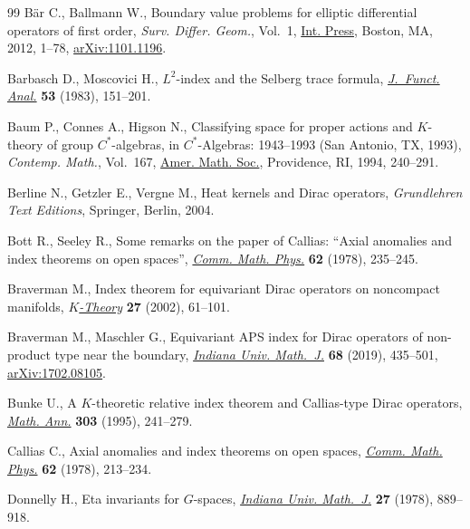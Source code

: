 \begin{thebibliography}{99}
B\"ar C., Ballmann W., Boundary value problems for elliptic differential
 operators of first order, \textit{{Surv. Differ. Geom.}}, Vol.~1, \href{https://doi.org/10.4310/SDG.2012.v17.n1.a1}{Int. Press}, Boston, MA, 2012, 1--78,
 \href{https://arxiv.org/abs/1101.1196}{arXiv:1101.1196}.

Barbasch D., Moscovici H., {$L^{2}$}-index and the {S}elberg trace formula,
 \href{https://doi.org/10.1016/0022-1236(83)90050-2}{\textit{J.~Funct. Anal.}} \textbf{53} (1983), 151--201.

Baum P., Connes A., Higson N., Classifying space for proper actions and
 {$K$}-theory of group {$C^\ast$}-algebras, in {$C^\ast$}-Algebras: 1943--1993
 ({S}an {A}ntonio, {TX}, 1993), \textit{Contemp. Math.}, Vol.~167, \href{https://doi.org/10.1090/conm/167/1292018}{Amer. Math.
 Soc.}, Providence, RI, 1994, 240--291.

Berline N., Getzler E., Vergne M., Heat kernels and {D}irac operators,
 \textit{Grundlehren Text Editions}, Springer, Berlin, 2004.

Bott R., Seeley R., Some remarks on the paper of {C}allias: ``{A}xial anomalies
 and index theorems on open spaces'', \href{https://doi.org/10.1007/BF01202526}{\textit{Comm. Math. Phys.}} \textbf{62}
 (1978), 235--245.

Braverman M., Index theorem for equivariant {D}irac operators on noncompact
 manifolds, \href{https://doi.org/10.1023/A:1020842205711}{\textit{$K$-Theory}} \textbf{27} (2002), 61--101.

Braverman M., Maschler G., Equivariant {APS} index for {D}irac operators of
 non-product type near the boundary, \href{https://doi.org/10.1512/iumj.2019.68.7621}{\textit{Indiana Univ. Math.~J.}}
 \textbf{68} (2019), 435--501, \href{https://arxiv.org/abs/1702.08105}{arXiv:1702.08105}.

Bunke U., A {$K$}-theoretic relative index theorem and {C}allias-type {D}irac
 operators, \href{https://doi.org/10.1007/BF01460989}{\textit{Math. Ann.}} \textbf{303} (1995), 241--279.

Callias C., Axial anomalies and index theorems on open spaces, \href{https://doi.org/10.1007/BF01202525}{\textit{Comm.
 Math. Phys.}} \textbf{62} (1978), 213--234.

Donnelly H., Eta invariants for {$G$}-spaces, \href{https://doi.org/10.1512/iumj.1978.27.27060}{\textit{Indiana Univ. Math.~J.}}
 \textbf{27} (1978), 889--918.


\end{thebibliography}
